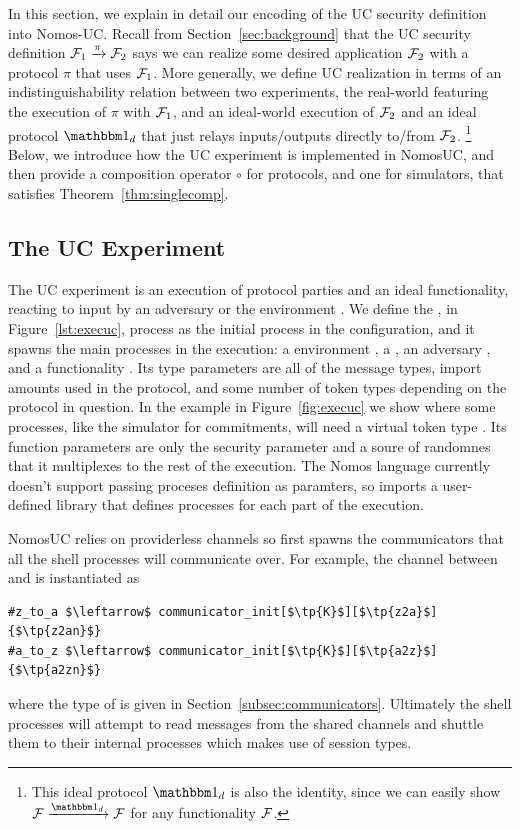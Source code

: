 In this section, we explain in detail our encoding of the UC security definition into Nomos-UC.
Recall from Section~\ref{sec:background} that the UC security definition $\mathcal{F}_1 \xrightarrow{\pi} \mathcal{F}_2$ says we can realize some desired application $\mathcal{F}_2$ with a protocol $\pi$ that uses $\mathcal{F}_1$.
More generally, we define UC realization in terms of an indistinguishability relation between two experiments, the real-world featuring the execution of $\pi$ with $\mathcal{F}_1$, and an ideal-world execution of $\mathcal{F}_2$ and an ideal protocol $\idealP$ that just relays inputs/outputs directly to/from $\mathcal{F}_2$.%
\footnote{This ideal protocol $\idealP$ is also the identity, since we can easily show $\F \xrightarrow{\idealP} \F$ for any functionality $\mathcal{F}$.}
Below, we introduce how the UC experiment is implemented in NomosUC, and then provide a composition operator $\circ$ for protocols, and one for simulators, that satisfies Theorem~\ref{thm:singlecomp}.

\subsection{The UC Experiment}
The UC experiment is an execution of protocol parties and an ideal functionality, reacting to input by an adversary \A or the environment \Z.
We define the , in Figure~\ref{lst:execuc}, process as the initial process in the configuration, and it spawns the main processes in the execution: a environment \Z, a \partywrapper, an adversary \A, and a functionality \F.
Its type parameters are all of the message types, import amounts used in the protocol, and some number of token types depending on the protocol in question. In the example in Figure~\ref{fig:execuc} we show  where some processes, like the simulator for commitments, will need a virtual token type .
Its function parameters are only the security parameter  and a soure of randomnes  that it multiplexes to the rest of the execution. 
The Nomos language currently doesn't support passing proceses definition as paramters, so  imports a user-defined library  that defines processes for each part of the execution.

NomosUC relies on providerless channels so  first spawns the communicators that all the shell processes will communicate over.
For example, the channel between \Z and \A is instantiated as 
\begin{lstlisting}[basicstyle=\footnotesize\BeraMonottFamily, mathescape]
#z_to_a $\leftarrow$ communicator_init[$\tp{K}$][$\tp{z2a}$]{$\tp{z2an}$}
#a_to_z $\leftarrow$ communicator_init[$\tp{K}$][$\tp{a2z}$]{$\tp{a2zn}$}
\end{lstlisting}
where the type of  is given in Section~\ref{subsec:communicators}.
Ultimately the shell processes will attempt to read messages from the shared channels and shuttle them to their internal processes which makes use of session types.

